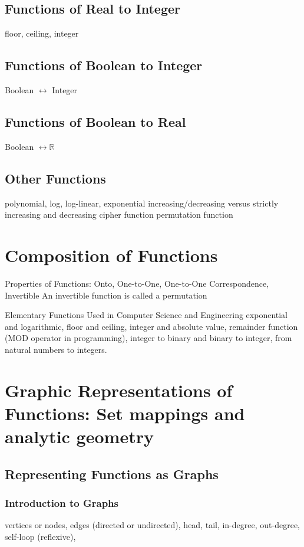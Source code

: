 \documentclass[11pt]{book} %
\theoremstyle {definition}
\theoremstyle {remark}
\begin{document}
    \subsection {Functions of Real to Integer}
floor, ceiling, integer
    \subsection{Functions of Boolean to Integer}
Boolean $\leftrightarrow$ Integer

    \subsection {Functions of Boolean to Real}
Boolean $\leftrightarrow \mathbb{R}$ 

    \subsection {Other Functions}
polynomial, log, log-linear, exponential
increasing/decreasing versus strictly increasing and decreasing
cipher function
permutation function



\section {Composition of Functions}

Properties of Functions: Onto, One-to-One, One-to-One Correspondence, Invertible
An invertible function is called a permutation

Elementary Functions Used in Computer Science and Engineering
exponential and logarithmic, floor and ceiling, integer and absolute value, remainder function (MOD operator in programming), integer to binary and binary to integer, from natural numbers to integers.


\section {Graphic Representations of Functions: Set mappings and analytic geometry}
    \subsection {Representing Functions as Graphs}
        \subsubsection {Introduction to Graphs}
vertices or nodes, edges (directed or undirected), head, tail, in-degree, out-degree, self-loop (reflexive), 
\end{document}
